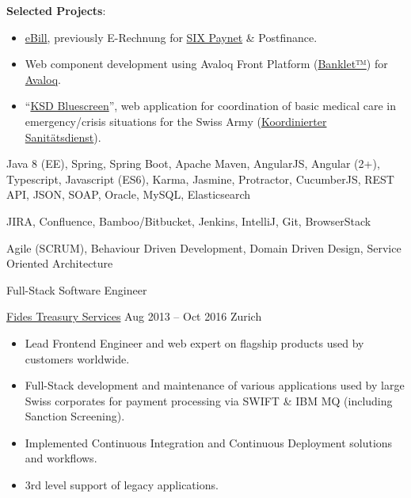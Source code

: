 \documentclass[11pt, a4paper, ragged2e, withhyper]{altacv}
\renewcommand{\cvevent}[4]{%
  {\Large\color{emphasis}#1\par}
  \medskip\normalsize
  \ifstrequal{#2}{}{}{
  	{#2}}
  \ifstrequal{#3}{}{}{{
  	\hspace{0.5em}
  	{#3}}}
  \ifstrequal{#4}{}{}{{
  	\hspace{0.5em}
  	{#4}}}\par
  \medskip\normalsize
}
\begin{document}
\begin{paracol}{2}
	\bigskip
	\textbf{\small{Selected Projects}}:
	\smallskip
	\begin{itemize}[label=\color{bullet}\textbullet]
		\small
		\item \href{https://www.ebill.ch/}{eBill}, previously E-Rechnung for \href{https://www.six-group.com/en/site/banking-services/paynet.html}{SIX Paynet} \& Postfinance.
		\item Web component development using Avaloq Front Platform (\href{https://developer.avaloq.com/web/developer-portal/learn}{Banklet™}) for \href{https://www.avaloq.com/en/}{Avaloq}.
		\item \enquote{\href{https://blog.alertswiss.ch/de/rubriken/bevoelkerungsschutz/koordinierter-sanitaetsdienst-ksd-neues-management-tool-blue-screen-switzerland/}{KSD Bluescreen}}, web application for coordination of basic medical care in emergency/crisis situations for the Swiss Army (\href{https://www.vtg.admin.ch/de/organisation/astab/san/ksd.html}{Koordinierter Sanitätsdienst}).
	\end{itemize}

	\bigskip
	\begin{description}
		\small
		\item [Technologies:] Java 8 (EE), Spring, Spring Boot, Apache Maven, AngularJS, Angular (2+), Typescript, Javascript (ES6), Karma, Jasmine, Protractor, CucumberJS, REST API, JSON, SOAP, Oracle, MySQL, Elasticsearch\smallskip
		\item [Tools:] JIRA, Confluence, Bamboo/Bitbucket, Jenkins, IntelliJ, Git, BrowserStack\smallskip
		\item [Methodologies:] Agile (SCRUM), Behaviour Driven Development, Domain Driven Design, Service Oriented Architecture
	\end{description}

	\bigskip\bigskip

	\cvevent{Full-Stack Software Engineer}{\href{https://www.fides.ch}{Fides Treasury Services}}{Aug 2013 -- Oct 2016}{Zurich}

	\bigskip
	\begin{itemize}[label=\color{bullet}\textbullet]
		\item Lead Frontend Engineer and web expert on flagship products used by customers worldwide.
		\item Full-Stack development and maintenance of various applications used by large Swiss corporates for payment processing via SWIFT \& IBM MQ (including Sanction Screening).
		\item Implemented Continuous Integration and Continuous Deployment solutions and workflows. 
		\item 3rd level support of legacy applications.
	\end{itemize}


\end{paracol}
\end{document}

